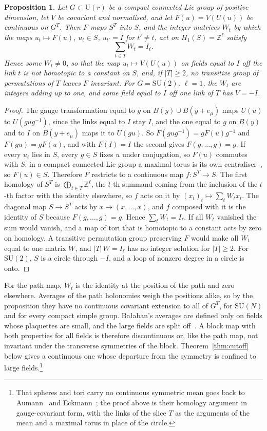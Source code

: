 \documentclass[11pt]{amsart}
\newtheorem{proposition}[theorem]{Proposition}
\theoremstyle{definition}
\theoremstyle{remark}
\numberwithin{equation}{section}
\newcommand{\Z}{\mathbb{Z}}
\newcommand{\SU}{\mathrm{SU}}
\newcommand{\U}{\mathrm{U}}
\begin{document}
\begin{proposition}\label{prop:nomean}
Let $G\subset\U(r)$ be a compact connected Lie group of positive dimension,
let $V$ be covariant and normalised, and let $F(u)=V(U(u))$ be continuous on
$G^T$. Then $F$ maps $S^T$ into $S$, and the integer matrices $W_t$ by which
the maps $u_t\mapsto F(u)$, $u_t\in S$, $u_{t'}=I$ for $t'\ne t$, act on
$H_1(S)=\Z^\ell$ satisfy
\[
\sum_{t\in T}W_t=I_\ell .
\]
Hence some $W_t\ne0$, so that the map $u_t\mapsto V(U(u))$ on fields equal
to $I$ off the link $t$ is not homotopic to a constant on $S$, and, if
$|T|\ge2$, no transitive group of permutations of $T$ leaves $F$ invariant.
For $G=\SU(2)$, $\ell=1$, the $W_t$ are integers adding up to one, and some
field equal to $I$ off one link of $T$ has $V=-I$.
\end{proposition}

\begin{proof}
The gauge transformation equal to $g$ on $B(y)\cup B(y+e_\mu)$ maps $U(u)$ to
$U(gug^{-1})$, since the links equal to $I$ stay $I$, and the one equal to
$g$ on $B(y)$ and to $I$ on $B(y+e_\mu)$ maps it to $U(gu)$. So
$F(gug^{-1})=gF(u)g^{-1}$ and $F(gu)=gF(u)$, and with $F(I)=I$ the second
gives $F(g,\dots,g)=g$. If every $u_t$ lies in $S$, every $g\in S$ fixes $u$
under conjugation, so $F(u)$ commutes with $S$; in a compact connected Lie
group a maximal torus is its own centraliser~\cite{Hel01}, so $F(u)\in S$.
Therefore $F$ restricts to a continuous map $f:S^T\to S$. The first homology
of $S^T$ is $\bigoplus_{t\in T}\Z^\ell$, the $t$-th summand coming from the
inclusion of the $t$-th factor with the identity elsewhere, so $f$ acts on it
by $(x_t)_t\mapsto\sum_tW_tx_t$. The diagonal map $S\to S^T$ acts by
$x\mapsto(x,\dots,x)$, and $f$ composed with it is the identity of $S$
because $F(g,\dots,g)=g$. Hence $\sum_tW_t=I_\ell$. If all $W_t$ vanished the
sum would vanish, and a map of tori that is homotopic to a constant acts by
zero on homology. A transitive permutation group preserving $F$ would make all
$W_t$ equal to one matrix $W$, and $|T|\,W=I_\ell$ has no integer solution
for $|T|\ge2$. For $\SU(2)$, $S$ is a circle through $-I$, and a loop of
nonzero degree in a circle is onto.
\end{proof}

For the path map, $W_t$ is the identity at the position of the path and zero
elsewhere. Averages of the path holonomies weigh the positions alike, so by
the proposition they have no continuous covariant extension to all of
$G^T$, for $\SU(N)$ and for every compact simple group. Ba{\l}aban's averages
are defined only on fields whose plaquettes are small, and the large fields
are split off~\cite{Bal84a,Bal89b}. A block map with both properties for all
fields is therefore discontinuous or, like the path map, not invariant under
the transverse symmetries of the block. Theorem~\ref{thm:cutoff} below gives
a continuous one whose departure from the symmetry is confined to large
fields.\footnote{That spheres and tori carry no continuous symmetric mean goes
back to Aumann~\cite{Aum44} and Eckmann~\cite{Eck54}; the proof above is
their homology argument in gauge-covariant form, with the links of the slice
$T$ as the arguments of the mean and a maximal torus in place of the
circle.}
\end{document}
